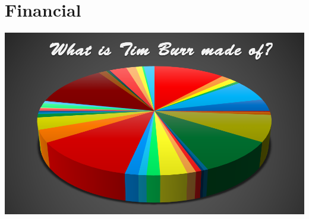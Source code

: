 \documentclass[
letterpaper, %
11pt, %
twoside,
onecolumn, %
openright, %
]{report}
\begin{document}

                                            
\chapter{Financial}
\vspace{3em}
\begin{minipage}[c]{\linewidth}
\centering
\includegraphics[width=\linewidth]{Images/Main/finance_cover_pic.png}
\end{minipage}




\end{document}
